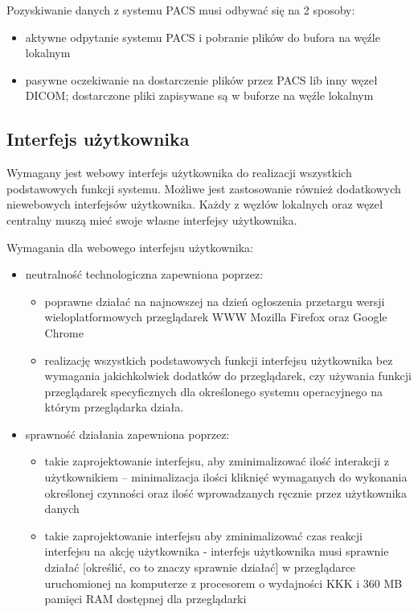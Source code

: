 \documentclass[a4paper]{article}
\begin{document}
Pozyskiwanie danych z systemu PACS musi odbywać się na 2 sposoby:
\begin{itemize}
  \item aktywne odpytanie systemu PACS i pobranie plików do bufora na węźle lokalnym
  \item pasywne oczekiwanie na dostarczenie plików przez PACS lib inny węzeł DICOM; dostarczone 
	pliki zapisywane są w buforze na węźle lokalnym
\end{itemize}

\subsection{Interfejs użytkownika}

Wymagany jest webowy interfejs użytkownika do realizacji wszystkich podstawowych funkcji systemu. 
Możliwe jest zastosowanie również dodatkowych niewebowych interfejsów użytkownika. Każdy z węzłów 
lokalnych oraz węzeł centralny muszą mieć swoje własne interfejsy użytkownika.

Wymagania dla webowego interfejsu użytkownika:

\begin{itemize}
    \item neutralność technologiczna zapewniona poprzez:
	  \begin{itemize}
	  \item poprawne działać na najnowszej na dzień ogłoszenia przetargu wersji
		  wieloplatformowych przeglądarek WWW Mozilla Firefox oraz Google Chrome
	  \item realizację wszystkich podstawowych funkcji interfejsu użytkownika
		  bez wymagania jakichkolwiek dodatków do przeglądarek, czy używania funkcji przeglądarek 
		  specyficznych dla określonego systemu operacyjnego na którym przeglądarka działa.
	  \end{itemize}
    \item sprawność działania zapewniona poprzez:
	  \begin{itemize}
	  \item takie zaprojektowanie interfejsu, aby zminimalizować ilość interakcji z 
		użytkownikiem -- minimalizacja ilości kliknięć wymaganych do wykonania określonej 
		czynności oraz ilość wprowadzanych ręcznie przez użytkownika danych
	  \item takie zaprojektowanie interfejsu aby zminimalizować czas reakcji interfejsu na 
		akcję użytkownika - interfejs użytkownika musi sprawnie działać [określić, co to 
		znaczy sprawnie działać] w przeglądarce uruchomionej na komputerze z procesorem o 
		wydajności KKK i 360 MB pamięci RAM dostępnej dla przeglądarki 
	  \end{itemize}
\end{itemize}
\end{document}
